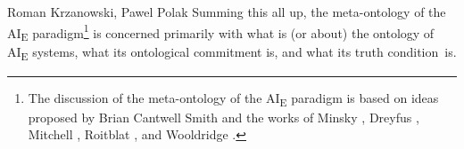 \begin{artengenv2auth}{Roman Krzanowski, Pawel Polak}
Summing this all up, the meta-ontology of the AI\textsubscript{E} paradigm\footnote{The discussion of the meta-ontology of the AI\textsubscript{E} paradigm is based on ideas proposed by Brian Cantwell Smith
\parencites*[][]{smith_origin_1998}[][]{smith_promise_2019} %
 and the works of Minsky 
\parencite*[][]{minsky_logical_1991}, %
 Dreyfus 
\parencite*[][]{dreyfus_skillful_2016}, %
 Mitchell 
\parencite*[][]{mitchell_artificial_2019}, %
 Roitblat 
\parencite*[][]{roitblat_algorithms_2020}, %
 and Wooldridge 
\parencite*[][]{wooldridge_road_2021}.%
} is concerned primarily with what is (or about) the ontology of AI\textsubscript{E} systems, what its ontological commitment is, and what its truth condition~is.


\end{artengenv2auth}
